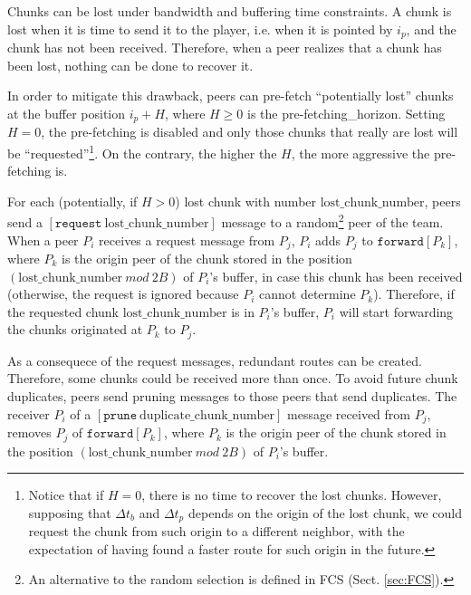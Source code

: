 

\label{sec:routes_discovery}

Chunks can be lost under bandwidth and buffering time constraints. A
chunk is lost when it is time to send it to the player, i.e. when it
is pointed by $i_p$, and the chunk has not been received. Therefore,
when a peer realizes that a chunk has been lost, nothing can be done
to recover it.

In order to mitigate this drawback, peers can pre-fetch ``potentially
lost'' chunks at the buffer position $i_p+H$, where $H\geq 0$ is the
\gls{pre-fetching_horizon}. Setting $H=0$, the pre-fetching is
disabled and only those chunks that really are lost will be
``requested''\footnote{Notice that if $H=0$, there is no time to
  recover the lost chunks. However, supposing that $\Delta t_b$ and
  $\Delta t_p$ depends on the origin of the lost chunk, we could
  request the chunk from such origin to a different neighbor, with the
  expectation of having found a faster route for such origin in the
  future.}. On the contrary, the higher the $H$, the more aggressive
the pre-fetching is.


For each (potentially, if $H>0$) lost chunk with number
$\text{lost\_chunk\_number}$, peers send a
$[\mathtt{request}~\text{lost\_chunk\_number}]$ message to a
random\footnote{An alternative to the random selection is defined in
  FCS (Sect. \ref{sec:FCS}).} peer of the team. When a peer $P_i$
receives a request message from $P_j$, $P_i$ adds $P_j$ to
$\mathtt{forward}[P_k]$, where $P_k$ is the origin peer of the chunk
stored in the position $(\text{lost\_chunk\_number}~\mathit{mod}~2B)$
of $P_i$'s buffer, in case this chunk has been received (otherwise,
the request is ignored because $P_i$ cannot determine
$P_k$). Therefore, if the requested chunk $\text{lost\_chunk\_number}$
is in $P_i$'s buffer, $P_i$ will start forwarding the chunks
originated at $P_k$ to $P_j$.

As a consequece of the request messages, redundant routes can be
created. Therefore, some chunks could be received more than once. To
avoid future chunk duplicates, peers send pruning messages to those
peers that send duplicates. The receiver $P_i$ of a
$[\mathtt{prune}~\text{duplicate\_chunk\_number}]$ message received
from $P_j$, removes $P_j$ of $\mathtt{forward}[P_k]$, where $P_k$ is
the origin peer of the chunk stored in the position
$(\text{lost\_chunk\_number}~\mathit{mod}~2B)$ of $P_i$'s buffer.

